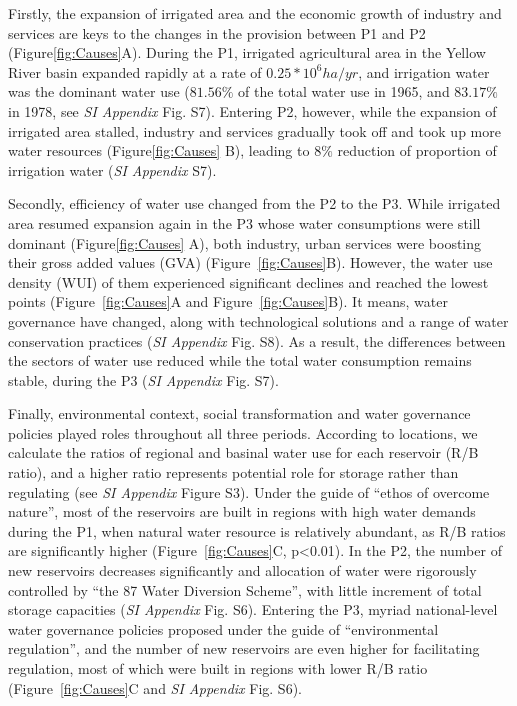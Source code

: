 \documentclass[9pt, twocolumn, twoside, lineno]{pnas-new}
\begin{document}
Firstly, the expansion of irrigated area and the economic growth of industry and services are keys to the changes in the provision between P1 and P2 (Figure\ref{fig:Causes}A). During the P1, irrigated agricultural area in the Yellow River basin expanded rapidly at a rate of $0.25*10^6 ha/yr$, and irrigation water was the dominant water use ($81.56\%$ of the total water use in 1965, and $83.17\%$ in 1978, see \textit{SI Appendix} Fig. S7). Entering P2, however, while the expansion of irrigated area stalled, industry and services gradually took off and took up more water resources (Figure\ref{fig:Causes} B), leading to $8\%$ reduction of proportion of irrigation water (\textit{SI Appendix} S7).

Secondly, efficiency of water use changed from the P2 to the P3.
While irrigated area resumed expansion again in the P3 whose water consumptions were still dominant (Figure\ref{fig:Causes} A), both industry, urban services were boosting their gross added values (GVA) (Figure~\ref{fig:Causes}B). 
However, the water use density (WUI) of them experienced significant declines and reached the lowest points (Figure~\ref{fig:Causes}A and Figure~\ref{fig:Causes}B).
It means, water governance have changed, along with technological solutions and a range of water conservation practices (\textit{SI Appendix} Fig. S8). As a result, the differences between the sectors of water use reduced while the total water consumption remains stable, during the P3 (\textit{SI Appendix} Fig. S7).

Finally, environmental context, social transformation and water governance policies played roles throughout all three periods. 
According to locations, we calculate the ratios of regional and basinal water use for each reservoir (R/B ratio), and a higher ratio represents potential role for storage rather than regulating (see \textit{SI Appendix} Figure S3).
Under the guide of ``ethos of overcome nature'', most of the reservoirs are built in regions with high water demands during the P1, when natural water resource is relatively abundant, as R/B ratios are significantly higher (Figure~\ref{fig:Causes}C, p<0.01). 
In the P2, the number of new reservoirs decreases significantly and allocation of water were rigorously controlled by ``the 87 Water Diversion Scheme'', with little increment of total storage capacities (\textit{SI Appendix} Fig. S6). 
Entering the P3, myriad national-level water governance policies proposed under the guide of ``environmental regulation'', and the number of new reservoirs are even higher for facilitating regulation, most of which were built in regions with lower R/B ratio (Figure~\ref{fig:Causes}C and \textit{SI Appendix} Fig. S6).
\end{document}
